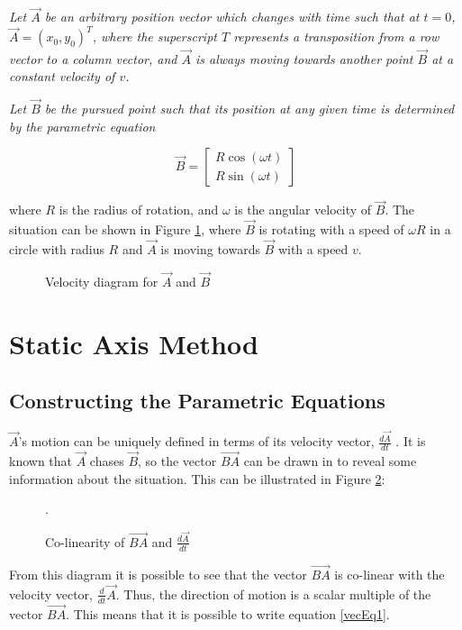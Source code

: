 \documentclass[pstricks, border=12pt]{article}
\begin{document}
\emph{Let $\vec A$ be an arbitrary position vector which changes with time such that at $t = 0$, $\vec A = (x_0, y_0)^T$, where the superscript $T$ represents a transposition from a row vector to a column vector, and $\Vec{A}$ is always moving towards another point $\Vec{B}$ at a constant velocity of $v$.}

\emph{Let $\Vec{B}$ be the pursued point such that its position at any given time is determined by the parametric equation}

\begin{equation}
    \Vec{B} = 
    \begin{bmatrix}
        R\cos(\omega t)\\
        R\sin(\omega t)
    \end{bmatrix}
\end{equation}

where $R$ is the radius of rotation, and $\omega$ is the angular velocity of $\vec B$. The situation can be shown in Figure \ref{problem diagram}, where $\vec B$ is rotating with a speed of $\omega R$ in a circle with radius $R$ and $\vec A$ is moving towards $\Vec{B}$ with a speed $v$.

\begin{figure}[tbh]
    \centering
    
    \caption{Velocity diagram for $\vec A$ and $\vec B$}
    \label{problem diagram}
\end{figure}


\section{Static Axis Method}\label{vec}
\subsection{Constructing the Parametric Equations}
$\Vec{A}$'s motion can be uniquely defined in terms of its velocity vector, $\frac{d\Vec{A}}{dt}$ \cite{wolframalpha_2022}. It is known that $\Vec{A}$ chases $\Vec{B}$, so the vector $\Vec{BA}$ can be drawn in to reveal some information about the situation. This can be illustrated in Figure \ref{fig:veldirect}:
\begin{figure}[tbh]
    \centering
    
    \caption{Co-linearity of $\vec {BA}$ and $\frac{d\vec A}{dt}$}.
    \label{fig:veldirect}
\end{figure}

From this diagram it is possible to see that the vector $\Vec{BA}$ is co-linear with the velocity vector, $\frac{d}{dt}\Vec{A}$. Thus, the direction of motion is a scalar multiple of the vector $\Vec{BA}$. This means that it is possible to write equation \eqref{vecEq1}. 
\end{document}
